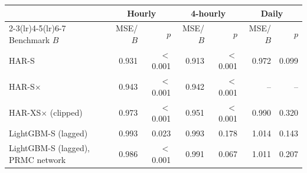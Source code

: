 \begin{tabular}{lrrrrrr}
\toprule
 & \multicolumn{2}{c}{Hourly} & \multicolumn{2}{c}{4-hourly} & \multicolumn{2}{c}{Daily} \\
\cmidrule(lr){2-3}\cmidrule(lr){4-5}\cmidrule(lr){6-7}
Benchmark $B$ & MSE/$B$ & $p$ & MSE/$B$ & $p$ & MSE/$B$ & $p$ \\
\midrule
HAR-S & 0.931 & $<$0.001 & 0.913 & $<$0.001 & 0.972 & 0.099 \\
HAR-S$\times$ & 0.943 & $<$0.001 & 0.942 & $<$0.001 & -- & -- \\
HAR-XS$\times$ (clipped) & 0.973 & $<$0.001 & 0.951 & $<$0.001 & 0.990 & 0.320 \\
LightGBM-S (lagged) & 0.993 & 0.023 & 0.993 & 0.178 & 1.014 & 0.143 \\
LightGBM-S (lagged), PRMC network & 0.986 & $<$0.001 & 0.991 & 0.067 & 1.011 & 0.207 \\
\bottomrule
\end{tabular}
